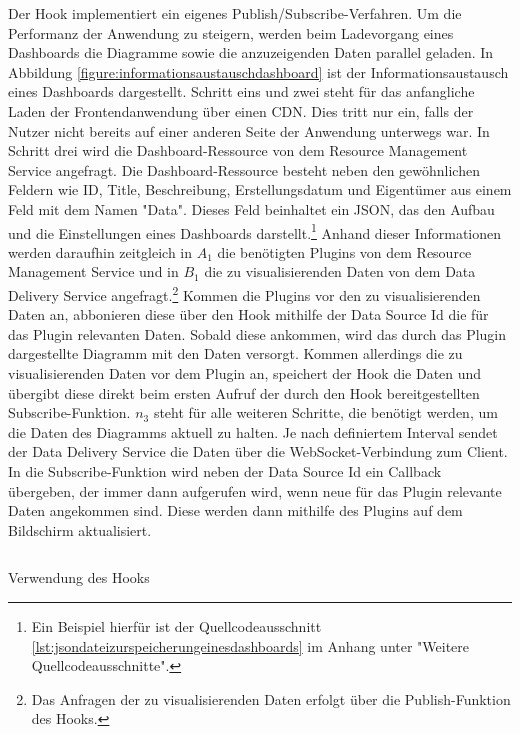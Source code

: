 Der  Hook implementiert ein eigenes Publish/Subscribe-Verfahren.
Um die Performanz der Anwendung zu steigern, werden beim Ladevorgang eines Dashboards
die Diagramme sowie die anzuzeigenden Daten parallel geladen. In Abbildung \ref{figure:informationsaustauschdashboard}
ist der Informationsaustausch eines Dashboards dargestellt. Schritt eins und zwei steht
für das anfangliche Laden der Frontendanwendung über einen CDN. Dies tritt nur ein,
falls der Nutzer nicht bereits auf einer anderen Seite der Anwendung unterwegs war.
In Schritt drei wird die Dashboard-Ressource von dem Resource Management Service angefragt.
Die Dashboard-Ressource besteht neben den gewöhnlichen Feldern wie ID, Title, Beschreibung,
Erstellungsdatum und Eigentümer aus einem Feld mit dem Namen "Data". Dieses Feld beinhaltet
ein JSON, das den Aufbau und die Einstellungen eines Dashboards darstellt.\footnote{Ein
Beispiel hierfür ist der Quellcodeausschnitt \ref{lst:jsondateizurspeicherungeinesdashboards}
im Anhang unter "Weitere Quellcodeausschnitte".} Anhand dieser Informationen werden
daraufhin zeitgleich in \( A_1 \) die benötigten Plugins von dem Resource Management Service
und in \( B_1 \) die zu visualisierenden Daten von dem Data Delivery Service angefragt.\footnote{Das Anfragen
der zu visualisierenden Daten erfolgt über die Publish-Funktion des 
 Hooks.}
Kommen die Plugins vor den zu visualisierenden Daten an, abbonieren diese über 
den  Hook mithilfe der Data Source Id die für das Plugin relevanten
Daten. Sobald diese ankommen, wird das durch das Plugin dargestellte Diagramm mit
den Daten versorgt. Kommen allerdings die zu visualisierenden Daten vor dem Plugin an,
speichert der  Hook die Daten und übergibt diese direkt beim
ersten Aufruf der durch den  Hook bereitgestellten
Subscribe-Funktion. \( n_3 \) steht für alle weiteren Schritte, die benötigt werden,
um die Daten des Diagramms aktuell zu halten. Je nach definiertem Interval sendet
der Data Delivery Service die Daten über die WebSocket-Verbindung zum Client.
In die Subscribe-Funktion wird neben der Data Source Id ein Callback übergeben,
der immer dann aufgerufen wird, wenn neue für das Plugin relevante Daten angekommen sind.
Diese werden dann mithilfe des Plugins auf dem Bildschirm aktualisiert.

\begin{listing}
    \inputminted{jsx}{snippets/jsx/useModalBeispiel.jsx}
    \caption{Verwendung des  Hooks}
    \label{lst:verwendungdesusemodalhooks}
\end{listing}

